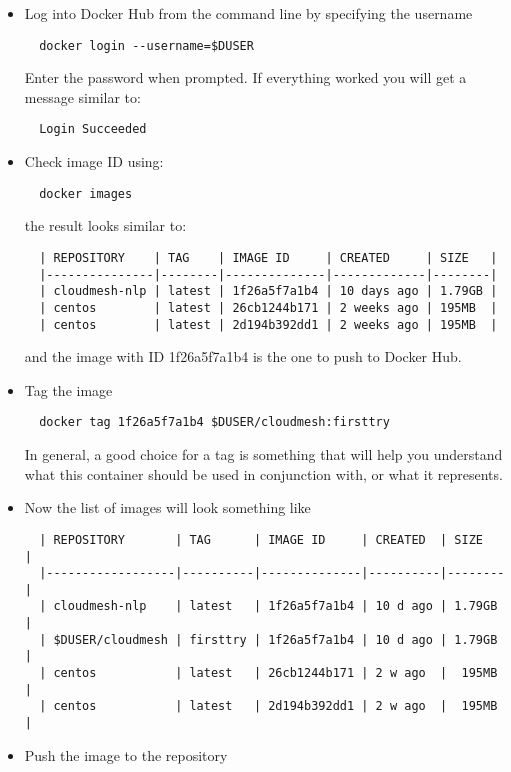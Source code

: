 \begin{itemize}
\item
  Log into Docker Hub from the command line by specifying the username

\begin{lstlisting}
  docker login --username=$DUSER
\end{lstlisting}

  Enter the password when prompted. If everything worked you will get a
  message similar to:

\begin{lstlisting}
  Login Succeeded
\end{lstlisting}
\item
  Check image ID using:

\begin{lstlisting}
  docker images
\end{lstlisting}

  the result looks similar to:

\begin{lstlisting}
  | REPOSITORY    | TAG    | IMAGE ID     | CREATED     | SIZE   |
  |---------------|--------|--------------|-------------|--------|
  | cloudmesh-nlp | latest | 1f26a5f7a1b4 | 10 days ago | 1.79GB |
  | centos        | latest | 26cb1244b171 | 2 weeks ago | 195MB  |
  | centos        | latest | 2d194b392dd1 | 2 weeks ago | 195MB  |
\end{lstlisting}

  and the image with ID 1f26a5f7a1b4 is the one to push to Docker Hub.
\item
  Tag the image

\begin{lstlisting}
  docker tag 1f26a5f7a1b4 $DUSER/cloudmesh:firsttry
\end{lstlisting}

  In general, a good choice for a tag is something that will help you
  understand what this container should be used in conjunction with, or
  what it represents.
\item
  Now the list of images will look something like

\begin{lstlisting}
  | REPOSITORY       | TAG      | IMAGE ID     | CREATED  | SIZE   |
  |------------------|----------|--------------|----------|--------|
  | cloudmesh-nlp    | latest   | 1f26a5f7a1b4 | 10 d ago | 1.79GB |
  | $DUSER/cloudmesh | firsttry | 1f26a5f7a1b4 | 10 d ago | 1.79GB |
  | centos           | latest   | 26cb1244b171 | 2 w ago  |  195MB |
  | centos           | latest   | 2d194b392dd1 | 2 w ago  |  195MB |
\end{lstlisting}
\item
  Push the image to the repository


\end{itemize}

